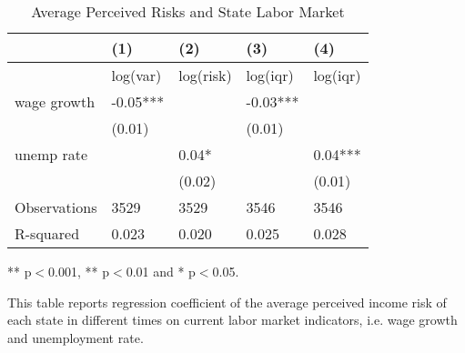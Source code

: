 	\begin{table}[ht]
		\centering
		\begin{adjustbox}{width=0.5\textwidth}
			\begin{threeparttable}
			\caption{Average Perceived Risks and State Labor Market}
			\label{macro_corr_he_state}
			\begin{tabular}{lllll}
				\hline 
				& (1)                & (2)                & (3)               & (4)               \\
				\hline 
				& log(var) & log(risk) & log(iqr) & log(iqr) \\
				\hline 
				wage growth & -0.05***           &                    & -0.03***          &                   \\
				
				& (0.01)             &                    & (0.01)            &                   \\
				unemp rate &                    & 0.04*              &                   & 0.04***           \\
				&                    & (0.02)             &                   & (0.01)            \\
				\hline 
				Observations      & 3529               & 3529               & 3546              & 3546              \\
				R-squared         & 0.023              & 0.020              & 0.025             & 0.028            \\
				\hline 
			\end{tabular}
			
				\begin{tablenotes}
					\item *** p$<$0.001, ** p$<$0.01 and * p$<$0.05.
					\item This table reports regression coefficient of the average perceived income risk of each state in different times on current labor market indicators, i.e. wage growth and unemployment rate. 
				\end{tablenotes}
			\end{threeparttable}
		\end{adjustbox}
	\end{table}
